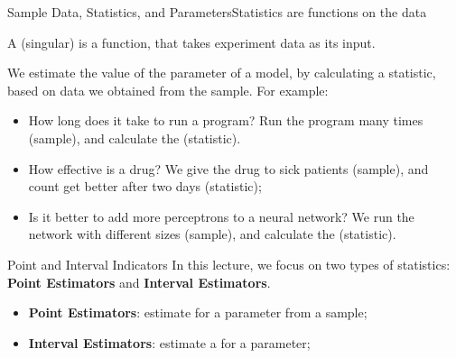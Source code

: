 \begin{frame}{Sample Data, Statistics, and Parameters}{Statistics are functions on the data}
  \begin{block}{}
    A  (singular) is a function, that takes experiment data as its input.
  \end{block}\medskip

  We estimate the value of the parameter of a model, by calculating a statistic, based on data we obtained from the sample. For example:\bigskip

  \begin{itemize}
    \item How long does it take to run a program? Run the program many times (sample), and calculate the  (statistic).
    \item How effective is a drug? We give the drug to sick patients (sample), and count  get better after two days (statistic);
    \item Is it better to add more perceptrons to a neural network? We run the network with different sizes (sample), and calculate the  (statistic).
  \end{itemize}\bigskip
\end{frame}

\begin{frame}{Point and Interval Indicators}
  In this lecture, we focus on two types of statistics: {\bf Point Estimators} and
  {\bf Interval Estimators}.\bigskip

  \begin{itemize}
    \item {\bf Point Estimators}: estimate  for a parameter from a sample;

    \item {\bf Interval Estimators}: estimate a  for a parameter;
  \end{itemize}
\end{frame}

